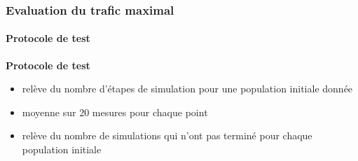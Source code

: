 \begin{frame}
    \frametitle{Evaluation du trafic maximal}
    \framesubtitle{Protocole de test}

    \textbf{Protocole de test}
    \begin{itemize}
        \item <2-> relève du nombre d'étapes de simulation pour une population initiale donnée
        \item <3-> moyenne sur 20 mesures pour chaque point
        \item <4-> relève du nombre de simulations qui n'ont pas terminé pour chaque population initiale
    \end{itemize}

\end{frame}




